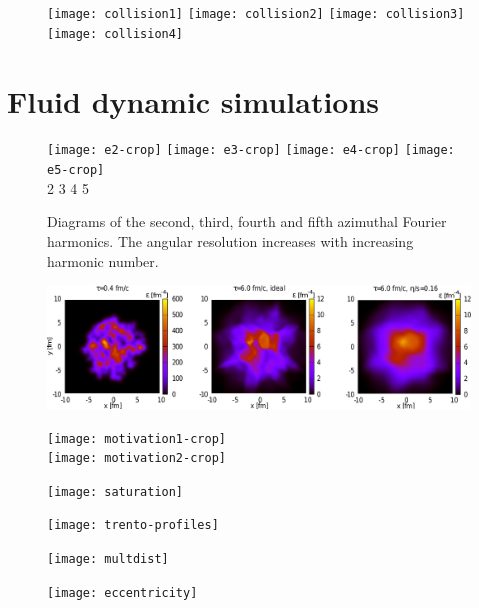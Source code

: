 \documentclass[aps,prc,reprint,amsmath,nofootinbib]{revtex4-1}
\begin{document}
\begin{figure}
 \texttt{[image: collision1]}
 \texttt{[image: collision2]}
 \texttt{[image: collision3]}
 \texttt{[image: collision4]}
\end{figure}

\section{Fluid dynamic simulations}

\begin{figure}
 \texttt{[image: e2-crop]} \hspace{.01\columnwidth} 
 \texttt{[image: e3-crop]} \hspace{.01\columnwidth}
 \texttt{[image: e4-crop]} \hspace{.01\columnwidth}
 \texttt{[image: e5-crop]}\\
 \flushleft
 \vspace{-0.1in}
 \hspace{0.08\columnwidth} 2 \hspace{0.19\columnwidth} 3 \hspace{0.21\columnwidth} 4 \hspace{0.22\columnwidth} 5
 \caption{Diagrams of the second, third, fourth and fifth azimuthal Fourier harmonics. The angular resolution increases with increasing harmonic number.}
\end{figure}

\begin{figure}
 \includegraphics[width=\textwidth]{three}
\end{figure}

\begin{figure}
 \texttt{[image: motivation1-crop]}\\
 \texttt{[image: motivation2-crop]}
\end{figure}

\begin{figure}
 \texttt{[image: saturation]}
\end{figure}

\begin{figure}
 \texttt{[image: trento-profiles]}
\end{figure}


\begin{figure}
 \texttt{[image: multdist]}
\end{figure}

\begin{figure}
 \texttt{[image: eccentricity]}
\end{figure}


\end{document}
